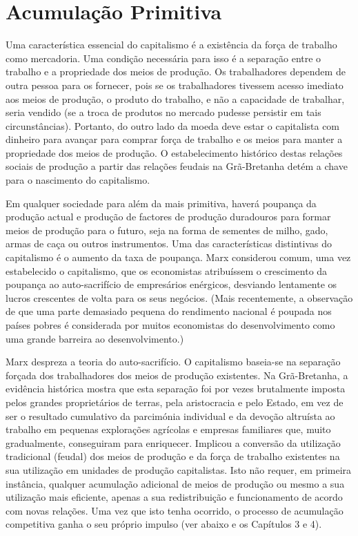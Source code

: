 \section{Acumulação Primitiva}
 \par 
Uma característica essencial do capitalismo é a existência da força de trabalho como mercadoria. Uma condição necessária para isso é a separação entre o trabalho e a propriedade dos meios de produção. Os trabalhadores dependem de outra pessoa para os fornecer, pois se os trabalhadores tivessem acesso imediato aos meios de produção, o produto do trabalho, e não a capacidade de trabalhar, seria vendido (se a troca de produtos no mercado pudesse persistir em tais circunstâncias). Portanto, do outro lado da moeda deve estar o capitalista com dinheiro para avançar para comprar força de trabalho e os meios para manter a propriedade dos meios de produção. O estabelecimento histórico destas relações sociais de produção a partir das relações feudais na Grã-Bretanha detém a chave para o nascimento do capitalismo.
 \par 
Em qualquer sociedade para além da mais primitiva, haverá poupança da produção actual e produção de factores de produção duradouros para formar meios de produção para o futuro, seja na forma de sementes de milho, gado, armas de caça ou outros instrumentos. Uma das características distintivas do capitalismo é o aumento da taxa de poupança. Marx considerou comum, uma vez estabelecido o capitalismo, que os economistas atribuíssem o crescimento da poupança ao auto-sacrifício de empresários enérgicos, desviando lentamente os lucros crescentes de volta para os seus negócios. (Mais recentemente, a observação de que uma parte demasiado pequena do rendimento nacional é poupada nos países pobres é considerada por muitos economistas do desenvolvimento como uma grande barreira ao desenvolvimento.)
 \par 
Marx despreza a teoria do auto-sacrifício. O capitalismo baseia-se na separação forçada dos trabalhadores dos meios de produção existentes. Na Grã-Bretanha, a evidência histórica mostra que esta separação foi por vezes brutalmente imposta pelos grandes proprietários de terras, pela aristocracia e pelo Estado, em vez de ser o resultado cumulativo da parcimónia individual e da devoção altruísta ao trabalho em pequenas explorações agrícolas e empresas familiares que, muito gradualmente, conseguiram para enriquecer. Implicou a conversão da utilização tradicional (feudal) dos meios de produção e da força de trabalho existentes na sua utilização em unidades de produção capitalistas. Isto não requer, em primeira instância, qualquer acumulação adicional de meios de produção ou mesmo a sua utilização mais eficiente, apenas a sua redistribuição e funcionamento de acordo com novas relações. Uma vez que isto tenha ocorrido, o processo de acumulação competitiva ganha o seu próprio impulso (ver abaixo e os Capítulos {\color{blue}3} e {\color{blue}4}).

